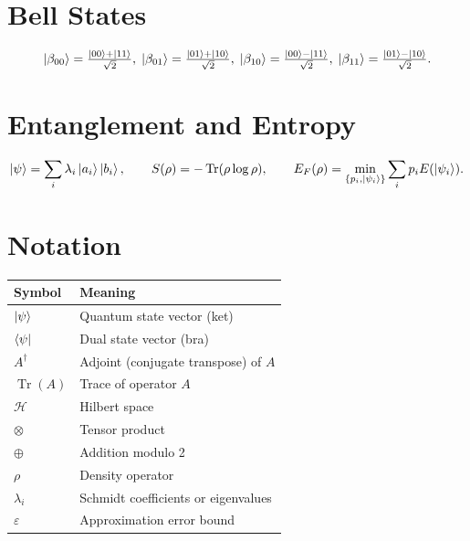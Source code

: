 \documentclass[12pt, a4paper, oneside]{report}
\theoremstyle{plain}
\theoremstyle{definition}
\theoremstyle{remark}
\DeclareMathOperator{\Tr}{Tr}
\newcommand{\Hcal}{\mathcal{H}}
\begin{document}
\section*{Bell States}
\[
	\ket{\beta_{00}} = \tfrac{\ket{00}+\ket{11}}{\sqrt{2}},\;
	\ket{\beta_{01}} = \tfrac{\ket{01}+\ket{10}}{\sqrt{2}},\;
	\ket{\beta_{10}} = \tfrac{\ket{00}-\ket{11}}{\sqrt{2}},\;
	\ket{\beta_{11}} = \tfrac{\ket{01}-\ket{10}}{\sqrt{2}}.
\]

\section*{Entanglement and Entropy}
\[
	\ket{\psi} = \sum_i\lambda_i\ket{a_i}\ket{b_i},\qquad
	S(\rho) = -\Tr(\rho\log\rho),\qquad
	E_F(\rho) = \min_{\{p_i,\ket{\psi_i}\}}\sum_i p_i E(\ket{\psi_i}).
\]

\section*{Notation}
\begin{center}
	\begin{tabular}{ll}
		\toprule
		\textbf{Symbol} & \textbf{Meaning}                     \\
		\midrule
		$\ket{\psi}$    & Quantum state vector (ket)           \\
		$\bra{\psi}$    & Dual state vector (bra)              \\
		$A^\dagger$     & Adjoint (conjugate transpose) of $A$ \\
		$\Tr(A)$        & Trace of operator $A$                \\
		$\Hcal$         & Hilbert space                        \\
		$\otimes$       & Tensor product                       \\
		$\oplus$        & Addition modulo 2                    \\
		$\rho$          & Density operator                     \\
		$\lambda_i$     & Schmidt coefficients or eigenvalues  \\
		$\varepsilon$   & Approximation error bound            \\
		\bottomrule
	\end{tabular}
\end{center}

\clearpage
{}
\end{document}
